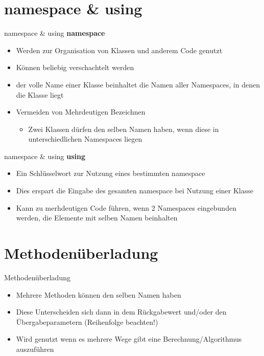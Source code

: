 \section{namespace \& using}
\begin{frame}{namespace \& using}
	\textbf{namespace}\\
	\begin{itemize}
		\item Werden zur Organisation von Klassen und anderem Code genutzt 
		\item Können beliebig verschachtelt werden
		\item der volle Name einer Klasse beinhaltet die Namen aller Namespaces, in denen die Klasse liegt
		\item Vermeiden von Mehrdeutigen Bezeichnen 
		\begin{itemize}
			\item Zwei Klassen dürfen den selben Namen haben, wenn diese in unterschiedlichen Namespaces liegen		
		\end{itemize}
	\end{itemize}	
	
\end{frame}

\begin{frame}{namespace \& using}
	\textbf{using}\\
	\begin{itemize}
		\item Ein Schlüsselwort zur Nutzung eines bestimmten \alert{namespace}
		\item Dies erspart die Eingabe des gesamten namespace bei Nutzung einer Klasse
		\item Kann zu merhdeutigen Code führen, wenn 2 Namespaces eingebunden werden, die Elemente mit selben Namen beinhalten
	\end{itemize}
	
\end{frame}

\section{Methodenüberladung}
\begin{frame}{Methodenüberladung}
	\begin{itemize}
		\item Mehrere Methoden können den selben Namen haben
		\item Diese Unterscheiden sich dann in dem Rückgabewert und/oder den Übergabeparametern (Reihenfolge beachten!) 
		\item Wird genutzt wenn es mehrere Wege gibt eine Berechnung/Algorithmus auszuführen
	\end{itemize}
	
\end{frame}

